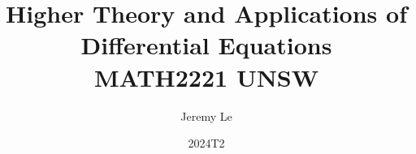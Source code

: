 \documentclass[12pt, letterpaper]{book}
\title{Higher Theory and Applications of Differential Equations \\ MATH2221 UNSW}
\author{Jeremy Le}
\date{2024T2}
\begin{document}
\maketitle


\begin{minipage}{\textwidth}
    \vfill
    \tableofcontents
\end{minipage}

\end{document}
